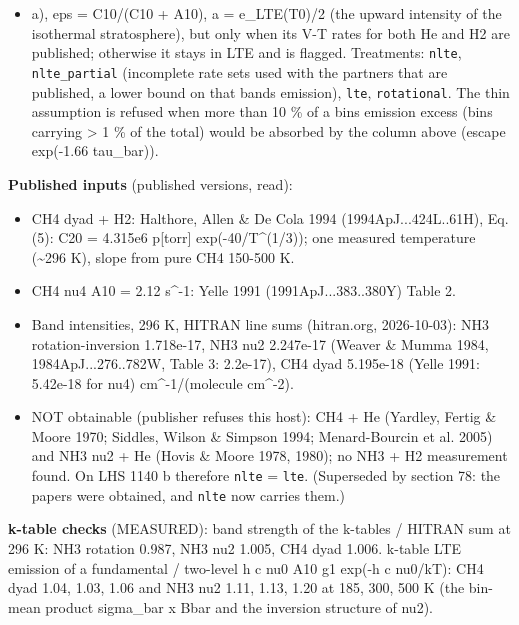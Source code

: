 \documentclass[english,a4paper]{my_memo}
\providecommand{\tightlist}{\setlength{\itemsep}{0pt}\setlength{\parskip}{0pt}}
\begin{document}
\begin{itemize}
\tightlist
\item
  a), eps = C10/(C10 + A10), a = e\_LTE(T0)/2 (the upward intensity of the
  isothermal stratosphere), but only when its V-T rates for both He and H2
  are published; otherwise it stays in LTE and is flagged. Treatments:
  \texttt{nlte}, \texttt{nlte\_partial} (incomplete rate sets used with the partners that
  are published, a lower bound on that band\textquotesingle s emission), \texttt{lte},
  \texttt{rotational}. The thin assumption is refused when more than 10 \% of a
  bin\textquotesingle s emission excess (bins carrying \textgreater{} 1 \% of the total) would be
  absorbed by the column above (escape exp(-1.66 tau\_bar)).
\end{itemize}

\textbf{Published inputs} (published versions, read):

\begin{itemize}
\tightlist
\item
  CH4 dyad + H2: Halthore, Allen \& De Cola 1994 (1994ApJ...424L..61H),
  Eq. (5): C20 = 4.315e6 p{[}torr{]} exp(-40/T\^{}(1/3)); one measured
  temperature (\textasciitilde296 K), slope from pure CH4 150-500 K.
\item
  CH4 nu4 A10 = 2.12 s\^{}-1: Yelle 1991 (1991ApJ...383..380Y) Table 2.
\item
  Band intensities, 296 K, HITRAN line sums (hitran.org, 2026-10-03):
  NH3 rotation-inversion 1.718e-17, NH3 nu2 2.247e-17 (Weaver \& Mumma 1984,
  1984ApJ...276..782W, Table 3: 2.2e-17), CH4 dyad 5.195e-18 (Yelle 1991:
  5.42e-18 for nu4) cm\^{}-1/(molecule cm\^{}-2).
\item
  NOT obtainable (publisher refuses this host): CH4 + He (Yardley, Fertig
  \& Moore 1970; Siddles, Wilson \& Simpson 1994; Menard-Bourcin et al.
  2005) and NH3 nu2 + He (Hovis \& Moore 1978, 1980); no NH3 + H2
  measurement found. On LHS 1140 b therefore \texttt{nlte} = \texttt{lte}. (Superseded
  by section 78: the papers were obtained, and \texttt{nlte} now carries them.)
\end{itemize}

\textbf{k-table checks} (MEASURED): band strength of the k-tables / HITRAN sum
at 296 K: NH3 rotation 0.987, NH3 nu2 1.005, CH4 dyad 1.006. k-table LTE
emission of a fundamental / two-level h c nu0 A10 g1 exp(-h c nu0/kT):
CH4 dyad 1.04, 1.03, 1.06 and NH3 nu2 1.11, 1.13, 1.20 at 185, 300,
500 K (the bin-mean product sigma\_bar x Bbar and the inversion structure
of nu2).
\end{document}
